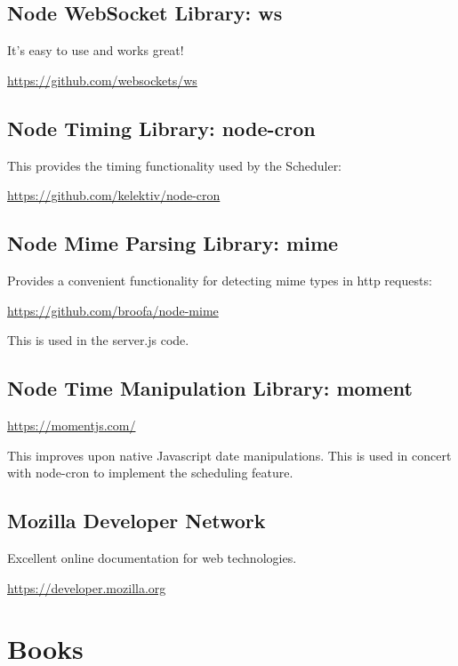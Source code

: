 \subsection{Node WebSocket Library: ws}

It's easy to use and works great!

\url{https://github.com/websockets/ws}

\subsection{Node Timing Library: node-cron}

This provides the timing functionality used by the Scheduler:

\url{https://github.com/kelektiv/node-cron}

\subsection{Node Mime Parsing Library: mime}

Provides a convenient functionality for detecting mime types in http requests:

\url{https://github.com/broofa/node-mime}

This is used in the server.js code.

\subsection{Node Time Manipulation Library: moment}

\url{https://momentjs.com/}

This improves upon native Javascript date manipulations.  This is used in 
concert with node-cron to implement the scheduling feature.

\subsection{Mozilla Developer Network}

Excellent online documentation for web technologies.

\url{https://developer.mozilla.org}

\section{Books}

